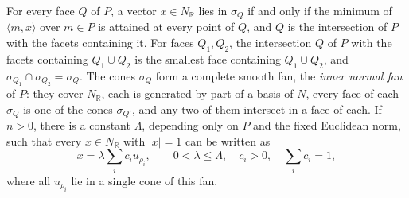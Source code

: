 \begin{proposition}\label{prop:normal-fan-and-uniform-ray-coefficients}
For every face $Q$ of $P$, a vector $x\in N_{\mathbb R}$ lies in $\sigma_Q$ if and only if the minimum of $\langle m,x\rangle$ over $m\in P$ is attained at every point of $Q$, and $Q$ is the intersection of $P$ with the facets containing it. For faces $Q_1,Q_2$, the intersection $Q$ of $P$ with the facets containing $Q_1\cup Q_2$ is the smallest face containing $Q_1\cup Q_2$, and $\sigma_{Q_1}\cap\sigma_{Q_2}=\sigma_Q$. The cones $\sigma_Q$ form a complete smooth fan, the \emph{inner normal fan} of $P$: they cover $N_{\mathbb R}$, each is generated by part of a basis of $N$, every face of each $\sigma_Q$ is one of the cones $\sigma_{Q'}$, and any two of them intersect in a face of each. If $n>0$, there is a constant $\Lambda$, depending only on $P$ and the fixed Euclidean norm, such that every $x\in N_{\mathbb R}$ with $|x|=1$ can be written as
\[
 x=\lambda\sum_i c_i u_{\rho_i},\qquad
 0<\lambda\leq\Lambda,\quad c_i>0,\quad\sum_i c_i=1,
\]
where all $u_{\rho_i}$ lie in a single cone of this fan.
\end{proposition}
